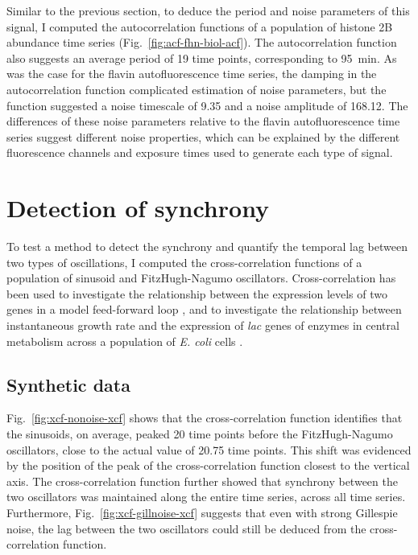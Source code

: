 Similar to the previous section, to deduce the period and noise parameters of this signal, I computed the autocorrelation functions of a population of histone 2B abundance time series (Fig.\ \ref{fig:acf-fhn-biol-acf}).
The autocorrelation function also suggests an average period of 19 time points, corresponding to \SI{95}{\minute}.
As was the case for the flavin autofluorescence time series, the damping in the autocorrelation function complicated estimation of noise parameters, but the function suggested a noise timescale of 9.35 and a noise amplitude of 168.12.
The differences of these noise parameters relative to the flavin autofluorescence time series suggest different noise properties, which can be explained by the different fluorescence channels and exposure times used to generate each type of signal.


\section{Detection of synchrony}
\label{sec:analysis-correlation}

To test a method to detect the synchrony and quantify the temporal lag between two types of oscillations, I computed the cross-correlation functions of a population of sinusoid and FitzHugh-Nagumo oscillators.
Cross-correlation has been used to investigate the relationship between the expression levels of two genes in a model feed-forward loop \parencite{dunlopRegulatoryActivityRevealed2008},
and to investigate the relationship between instantaneous growth rate and the expression of \textit{lac} genes of enzymes in central metabolism across a population of \textit{E. coli} cells \parencite{kivietStochasticityMetabolismGrowth2014}.


\subsection{Synthetic data}
\label{subsubsec:analysis-correlation-synthetic}

Fig.\ \ref{fig:xcf-nonoise-xcf} shows that the cross-correlation function identifies that the sinusoids, on average, peaked 20 time points before the FitzHugh-Nagumo oscillators, close to the actual value of 20.75 time points.
This shift was evidenced by the position of the peak of the cross-correlation function closest to the vertical axis.
The cross-correlation function further showed that synchrony between the two oscillators was maintained along the entire time series, across all time series.
Furthermore, Fig.\ \ref{fig:xcf-gillnoise-xcf} suggests that even with strong Gillespie noise, the lag between the two oscillators could still be deduced from the cross-correlation function.

